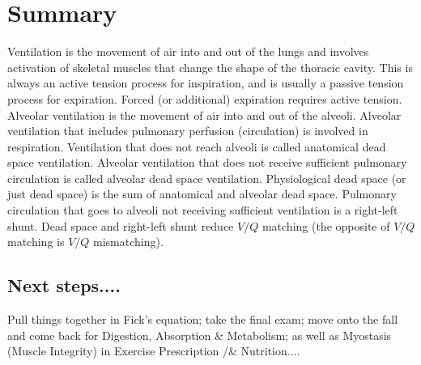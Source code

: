 \section{Summary}
Ventilation is the movement of air into and out of the lungs and involves activation of skeletal muscles that change the shape of the thoracic cavity. This is always an active tension process for inspiration, and is usually a passive tension process for expiration. Forced (or additional) expiration requires active tension. 
Alveolar ventilation is the movement of air into and out of the alveoli. Alveolar ventilation that includes pulmonary perfusion (circulation) is involved in respiration. Ventilation that does not reach alveoli is called anatomical dead space ventilation. Alveolar ventilation that does not receive sufficient pulmonary circulation is called alveolar dead space ventilation. Physiological dead space (or just dead space) is the sum of anatomical and alveolar dead space. Pulmonary circulation that goes to alveoli not receiving sufficient ventilation is a right-left shunt. Dead space and right-left shunt reduce $V/Q$ matching (the opposite of $V/Q$ matching is $V/Q$ mismatching). 

\subsection{Next steps....}
Pull things together in Fick's equation; take the final exam; move onto the fall and come back for Digestion, Absorption \& Metabolism; as well as Myostasis (Muscle Integrity) in Exercise Prescription /& Nutrition....

\printbibliography[heading=subbibintoc]